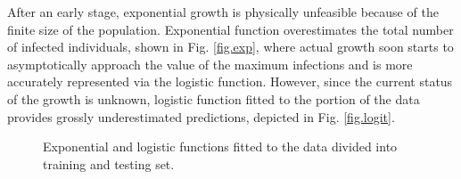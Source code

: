 \documentclass[conference]{IEEEtran}
\begin{document}
After an early stage, exponential growth is physically unfeasible because of the finite size of the population. Exponential function overestimates the total number of infected individuals, shown in Fig. \ref{fig.exp}, where actual growth soon starts to asymptotically approach the value of the maximum infections and is more accurately represented via the logistic function. However, since the current status of the growth is unknown, logistic function fitted to the portion of the data provides grossly underestimated predictions, depicted in Fig. \ref{fig.logit}.
\begin{figure}[!t]
    \centering
    \hfil
    \caption{Exponential and logistic functions fitted to the data divided into training and testing set.}
    \label{fig.exp-logit}
\end{figure}
\end{document}
